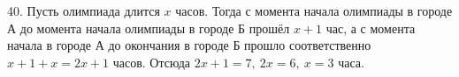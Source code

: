 40. Пусть олимпиада длится $x$ часов. Тогда с момента начала олимпиады в городе А до момента начала олимпиады в городе Б прошёл $x+1$ час, а с момента начала в городе А до окончания в городе Б прошло соответственно $x+1+x=2x+1$ часов. Отсюда $2x+1=7,\ 2x=6,\ x=3$ часа.\\
